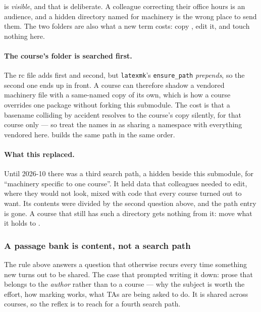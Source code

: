  is \emph{visible}, and that is deliberate.
A colleague correcting their office hours is an audience, and a hidden directory named for machinery is the wrong place to send them.
The two folders are also what a new term costs: copy , edit it, and touch nothing here.

\paragraph{The course's folder is searched first.}
The rc file adds  first and  second, but \texttt{latexmk}'s \texttt{ensure\_path} \emph{prepends}, so the second one ends up in front.
A course can therefore shadow a vendored machinery file with a same-named copy of its own, which is how a course overrides one package without forking this submodule.
The cost is that a basename colliding by accident resolves to the course's copy silently, for that course only --- so treat the names in  as sharing a namespace with everything vendored here.
 builds the same path in the same order.

\paragraph{What this replaced.}
Until 2026-10 there was a third search path, a hidden  beside this submodule, for ``machinery specific to one course''.
It held data that colleagues needed to edit, where they would not look, mixed with code that every course turned out to want.
Its contents were divided by the second question above, and the path entry is gone.
A course that still has such a directory gets nothing from it: move what it holds to .

\subsubsection*{A passage bank is content, not a search path}

The rule above answers a question that otherwise recurs every time something
new turns out to be shared. The case that prompted writing it down: prose
that belongs to the \emph{author} rather than to a course --- why the subject
is worth the effort, how marking works, what TAs are being asked to do. It is
shared across courses, so the reflex is to reach for a fourth search path.

